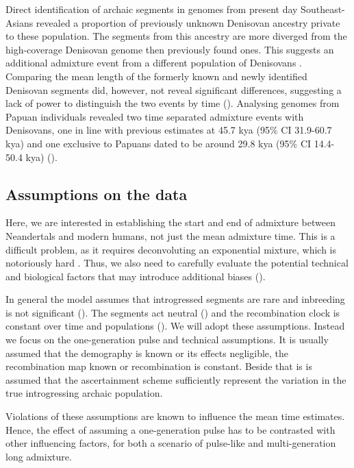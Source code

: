 \documentclass[]{article}
\begin{document}
Direct identification of archaic segments in genomes from present day Southeast-Asians revealed a proportion of previously unknown Denisovan ancestry private to these population. The segments from this ancestry are more diverged from the high-coverage Denisovan genome then previously found ones. This suggests an additional admixture event from a different population of Denisovans \cite{browning_analysis_2018}.
Comparing the mean length of the formerly known and newly identified Denisovan segments did, however, not reveal
significant differences, suggesting a lack of power to distinguish the
two events by time (\cite{browning_analysis_2018,jacobs_multiple_2019}).
Analysing genomes from Papuan individuals revealed two time separated
admixture events with Denisovans, one in line with previous estimates at
45.7 kya (95\% CI 31.9-60.7 kya) and one exclusive to Papuans dated to
be around 29.8 kya (95\% CI 14.4-50.4 kya)
(\cite{jacobs_multiple_2019}).

\subsection{Assumptions on the data}\label{assumptions-on-the-data}
Here, we are interested in establishing the start and end of admixture between Neandertals and modern humans, not just the mean admixture time. This is a difficult problem, as it requires deconvoluting an exponential mixture, which is notoriously hard . Thus, we also need to carefully evaluate the potential technical and biological factors that may introduce additional biases (\cite{pool_inference_2009,gravel_population_2012,liang_lengths_2014}).



In general the model assumes that introgressed segments are rare and inbreeding is not significant (\cite{pool_inference_2009}). The segments act neutral (\cite{shchur_distribution_2019}) and the recombination clock is constant over time and populations (\cite{gravel_population_2012}). We will adopt these assumptions. Instead we focus on the one-generation pulse and technical assumptions. It is usually assumed that the demography is known or its effects negligible, the recombination map known or recombination is constant. Beside that is is assumed that the ascertainment scheme sufficiently represent the variation in the true introgressing archaic population.

Violations of these assumptions are known to influence the mean time
estimates. Hence, the effect of assuming a one-generation pulse has to
be contrasted with other influencing factors, for both a scenario of
pulse-like and multi-generation long admixture. 
\end{document}
